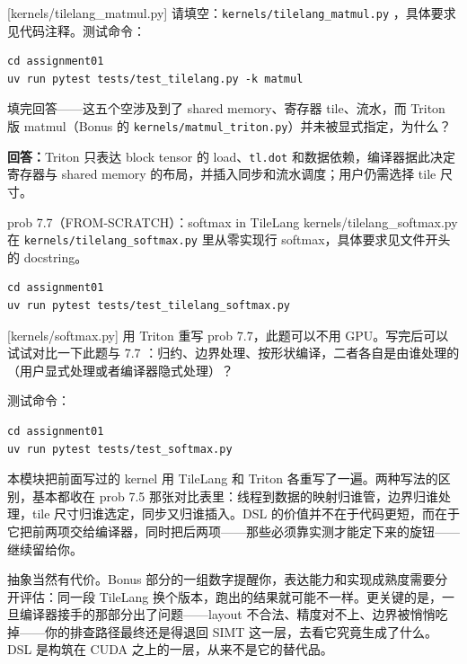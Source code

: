 \documentclass[11pt,a4paper,fontset=windows]{ctexart}
\begin{document}
[kernels/tilelang\_matmul.py]
请填空：\texttt{kernels/tilelang\_matmul.py} ，具体要求见代码注释。测试命令：

\begin{lstlisting}
cd assignment01
uv run pytest tests/test_tilelang.py -k matmul
\end{lstlisting}

填完回答——这五个空涉及到了 shared memory、寄存器 tile、流水，而 Triton 版 matmul（Bonus 的 \texttt{kernels/matmul\_triton.py}）并未被显式指定，为什么？

\par\textbf{回答：}Triton 只表达 block tensor 的 load、\texttt{tl.dot} 和数据依赖，编译器据此决定寄存器与 shared memory 的布局，并插入同步和流水调度；用户仍需选择 tile 尺寸。

\begin{capstone}{prob 7.7（FROM-SCRATCH）：softmax in TileLang \hfill {\footnotesize\ttfamily kernels/tilelang\_softmax.py}}
在 \texttt{kernels/tilelang\_softmax.py} 里从零实现行 softmax，具体要求见文件开头的 docstring。
\end{capstone}

\begin{lstlisting}
cd assignment01
uv run pytest tests/test_tilelang_softmax.py
\end{lstlisting}

[kernels/softmax.py]
用 Triton 重写 prob 7.7，此题可以不用 GPU。写完后可以试试对比一下此题与 7.7 ：归约、边界处理、按形状编译，二者各自是由谁处理的（用户显式处理或者编译器隐式处理）？

测试命令：

\begin{lstlisting}
cd assignment01
uv run pytest tests/test_softmax.py
\end{lstlisting}

\begin{lookback}
本模块把前面写过的 kernel 用 TileLang 和 Triton 各重写了一遍。两种写法的区别，基本都收在 prob 7.5 那张对比表里：线程到数据的映射归谁管，边界归谁处理，tile 尺寸归谁选定，同步又归谁插入。DSL 的价值并不在于代码更短，而在于它把前两项交给编译器，同时把后两项——那些必须靠实测才能定下来的旋钮——继续留给你。

抽象当然有代价。Bonus 部分的一组数字提醒你，表达能力和实现成熟度需要分开评估：同一段 TileLang 换个版本，跑出的结果就可能不一样。更关键的是，一旦编译器接手的那部分出了问题——layout 不合法、精度对不上、边界被悄悄吃掉——你的排查路径最终还是得退回 SIMT 这一层，去看它究竟生成了什么。DSL 是构筑在 CUDA 之上的一层，从来不是它的替代品。
\end{lookback}
\end{document}
